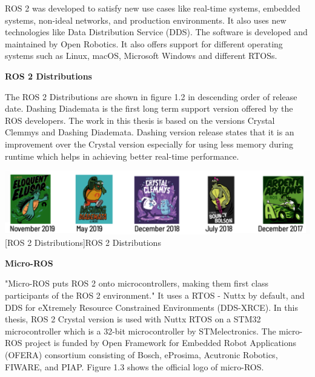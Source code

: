 \documentclass[%
xelatex,
	oneside,		%
	12pt,			%
	parskip=half,	%
	abstracton,
	chapterprefix=true%
    appendixprefix=true]
{scrbook}
\begin{document}
ROS 2 was developed to satisfy new use cases like real-time systems, embedded systems, non-ideal networks, and production environments. It also uses new technologies like Data Distribution Service (DDS). The software is developed and maintained by Open Robotics.
It also offers support for different operating systems such as Linux, macOS, Microsoft Windows and different RTOSs. 

{\bfseries	 ROS 2 Distributions}
	 

The ROS 2 Distributions are shown in figure 1.2 in descending order of release date. Dashing Diademata is the first long term support version offered by the ROS developers. The work in this thesis is based on the versions Crystal Clemmys and Dashing Diademata. Dashing version release states that it is an improvement over the Crystal version especially for using less memory during runtime which helps in achieving better real-time performance. 

 \includegraphics[scale=0.85]{fig/ros2distro.png}
[ROS 2 Distributions]{ROS 2 Distributions \cite{ROS2distro}}
\label{fig:ROS2Distro}

\vspace*{1cm}

{\bfseries Micro-ROS}
\vspace*{0.5cm}

"Micro-ROS puts ROS 2 onto microcontrollers, making them first class participants of the ROS 2 environment." \cite{uros}	
It uses a RTOS - Nuttx by default, and DDS for eXtremely Resource Constrained Environments (DDS-XRCE). In this thesis, ROS 2 Crystal version is used with Nuttx RTOS on a STM32 microcontroller which is a 32-bit microcontroller by STMelectronics. The micro-ROS project is funded by Open Framework for Embedded Robot Applications (OFERA) consortium consisting of Bosch, eProsima, Acutronic Robotics, FIWARE, and PIAP. Figure 1.3 shows the official logo of micro-ROS.
\end{document}
